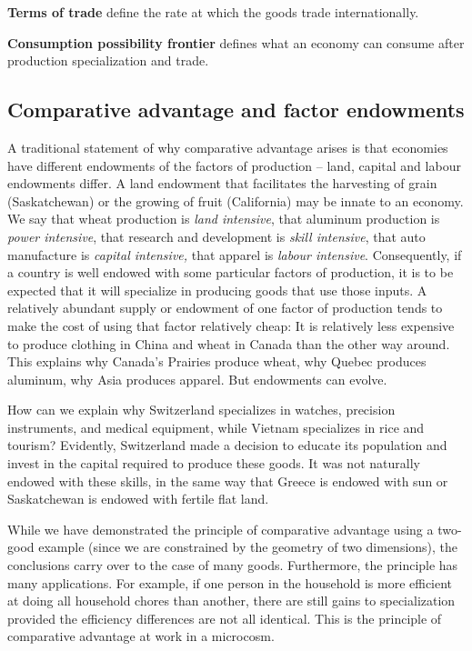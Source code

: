 \begin{DefBox}
	\textbf{Terms of trade} define the rate at which the goods trade internationally.
	
	\textbf{Consumption possibility frontier} defines what an economy can consume after production specialization and trade.
\end{DefBox}
	
\newhtmlpage

\subsection*{Comparative advantage and factor endowments}

A traditional statement of why comparative advantage arises is that
economies have different endowments of the factors of production -- land,
capital and labour endowments differ. A land endowment that facilitates the
harvesting of grain (Saskatchewan) or the growing of fruit (California) may
be innate to an economy. We say that wheat production is \textit{land
	intensive}, that aluminum production is \textit{power intensive}, that
research and development is \textit{skill intensive}, that auto manufacture
is \textit{capital intensive,} that apparel is \textit{labour intensive}.
Consequently, if a country is well endowed with some particular factors of
production, it is to be expected that it will specialize in producing goods
that use those inputs. A relatively abundant supply or endowment of one
factor of production tends to make the cost of using that factor relatively
cheap: It is relatively less expensive to produce clothing in China and
wheat in Canada than the other way around. This explains why Canada's
Prairies produce wheat, why Quebec produces aluminum, why Asia produces
apparel. But endowments can evolve.

How can we explain why Switzerland specializes in watches, precision
instruments, and medical equipment, while Vietnam specializes in rice and
tourism? Evidently, Switzerland made a decision to educate its population
and invest in the capital required to produce these goods. It was not
naturally endowed with these skills, in the same way that Greece is endowed
with sun or Saskatchewan is endowed with fertile flat land.

While we have demonstrated the principle of comparative advantage using a
two-good example (since we are constrained by the geometry of two
dimensions), the conclusions carry over to the case of many goods.
Furthermore, the principle has many applications. For example, if one person
in the household is more efficient at doing all household chores than
another, there are still gains to specialization provided the efficiency
differences are not all identical. This is the principle of comparative
advantage at work in a microcosm.

